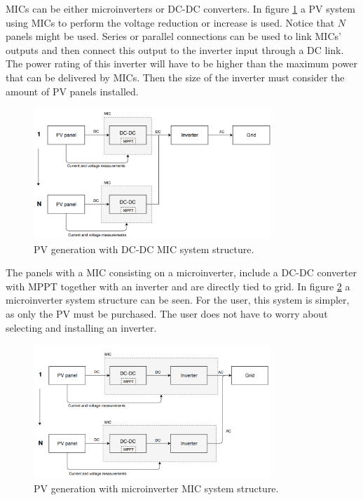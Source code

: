 MICs can be either microinverters or DC-DC converters. In figure \ref{MIC_dcdc} a PV system using MICs to perform the voltage reduction or increase is used. Notice that $N$ panels might be used. Series or parallel connections can be used to link MICs' outputs and then connect this output to the inverter input through a DC link.  The power rating of this inverter will have to be higher than the maximum power that can be delivered by MICs. Then the size of the inverter must consider the amount of PV panels installed.

\begin{figure}[H]
	\begin{center}
		\includegraphics[width=0.8\textwidth]{../Pictures/MIC_dcdc}
		\caption{PV generation with DC-DC MIC system structure.}
		\label{MIC_dcdc}
	\end{center}	
\end{figure}

The panels with a MIC consisting on a microinverter, include a DC-DC converter with MPPT together with an inverter and are directly tied to grid. In figure \ref{microinverter_system} a microinverter system structure can be seen. For the user, this system is simpler, as only the PV must be purchased. The user does not have to worry about selecting and installing an inverter. 

\begin{figure}[H]
	\begin{center}
	\includegraphics[width=0.8\textwidth]{../Pictures/MIC_microinverter}
		\caption{PV generation with microinverter MIC system structure.}
		\label{microinverter_system}
	\end{center}	
\end{figure}

